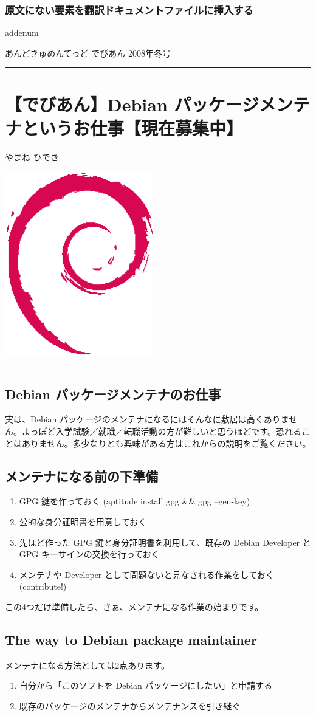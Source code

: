 \documentclass[mingoth,a4paper]{jsarticle}
\renewcommand{\dancersection}[2]{%
\newpage
あんどきゅめんてっど でびあん 2008年冬号
%
\vspace{0.1mm}\\
{\color{dancerlightblue}\rule{\hsize}{2mm}}

%
%
\begin{minipage}[t]{0.6\hsize}
\color{dancerdarkblue}
\vspace{1cm}
\section{#1}
\hfill{}#2\\
\end{minipage}
\begin{minipage}[t]{0.4\hsize}
\vspace{-2cm}
\hfill{}\includegraphics[height=8cm]{image200502/openlogo-nd.eps}\\
\vspace{-5cm}
\end{minipage}
%
%
{\color{dancerdarkblue}\rule{0.74\hsize}{2mm}}
%
\vspace{2cm}
}
\begin{document}
\subsubsection{原文にない要素を翻訳ドキュメントファイルに挿入する}

addenum

\dancersection{【でびあん】Debian パッケージメンテナというお仕事【現在募集中】}{やまね ひでき}

\label{sec:dm-yamane}

\subsection{Debian パッケージメンテナのお仕事}

実は、Debian パッケージのメンテナになるにはそんなに敷居は高くありません。よっぽど入学試験／就職／転職活動の方が難しいと思うほどです。恐れることはありません。多少なりとも興味がある方はこれからの説明をご覧ください。

\subsection{メンテナになる前の下準備}

\begin{enumerate}
 \item GPG 鍵を作っておく (aptitude install gpg \&\& gpg --gen-key)
 \item 公的な身分証明書を用意しておく
 \item 先ほど作った GPG 鍵と身分証明書を利用して、既存の Debian Developer とGPG キーサインの交換を行っておく
 \item メンテナや Developer として問題ないと見なされる作業をしておく (contribute!)
\end{enumerate}

この4つだけ準備したら、さぁ、メンテナになる作業の始まりです。


\subsection{The way to Debian package maintainer}

メンテナになる方法としては2点あります。

\begin{enumerate}
 \item 自分から「このソフトを Debian パッケージにしたい」と申請する
 \item 既存のパッケージのメンテナからメンテナンスを引き継ぐ
\end{enumerate}
\end{document}
